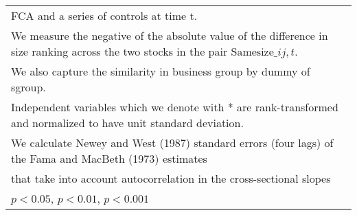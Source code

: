 {\begin{tabular}{l*{6}{c}}
\multicolumn{7}{l}{\footnotesize  FCA and a series of controls at time t.}\\
\multicolumn{7}{l}{\footnotesize We measure the negative of the absolute value of the difference in size ranking across the two stocks in the pair $ \text{Samesize}\_{ij,t} $.}\\
\multicolumn{7}{l}{\footnotesize We also capture the similarity in business group by dummy of sgroup.}\\
\multicolumn{7}{l}{\footnotesize Independent variables which  we denote with * are rank-transformed and normalized to have unit standard deviation.}\\
\multicolumn{7}{l}{\footnotesize  We calculate Newey and West (1987) standard errors (four lags) of the Fama and MacBeth (1973) estimates }\\
\multicolumn{7}{l}{\footnotesize  that take into account autocorrelation in the cross-sectional slopes}\\
\multicolumn{7}{l}{\footnotesize \sym{*} \(p<0.05\), \sym{**} \(p<0.01\), \sym{***} \(p<0.001\)}\\
\end{tabular}
}
